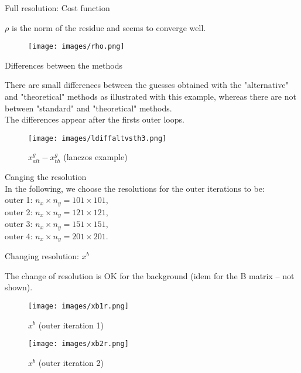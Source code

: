 \documentclass[francais]{beamer}
\begin{document}
\begin{frame}{Full resolution: Cost function}
\begin{center}
$\rho$ is the norm of the residue and seems to converge well.
\endminipage \hfill
{}%
\begin{figure}
  \texttt{[image: images/rho.png]}
\end{figure}
\endminipage
\end{center}
\end{frame}


\begin{frame}{Differences between the methods}
\begin{center}
There are small differences between the guesses obtained with the "alternative" and "theoretical" methods as illustrated with this example, whereas there are not between "standard" and "theoretical" methods.\\
The differences appear after the firsts outer loops.
\endminipage \hfill
{}%
\begin{figure}
  \texttt{[image: images/ldiffaltvsth3.png]}
  \caption{$x^g_{alt}-x^g_{th}$ (lanczos example)}
\end{figure}
\endminipage
\end{center}
\end{frame}


\begin{frame}
\begin{center}
  {\huge Canging the resolution}\\
  \vspace{+1cm}
In the following, we choose the resolutions for the outer iterations to be:\\
outer 1: $n_x \times n_y = 101 \times 101$,\\
outer 2: $n_x \times n_y = 121 \times 121$,\\
outer 3: $n_x \times n_y = 151 \times 151$,\\
outer 4: $n_x \times n_y = 201 \times 201$.
\end{center}
\end{frame}

\begin{frame}{Changing resolution: $x^b$}
\begin{center}
The change of resolution is OK for the background (idem for the B matrix -- not shown).
\begin{figure}
  \texttt{[image: images/xb1r.png]}
  \caption{$x^b$ (outer iteration 1)}
\endminipage\hfill
{}
  \texttt{[image: images/xb2r.png]}
  \caption{$x^b$ (outer iteration 2)}
\endminipage
\end{figure}
\end{center}
\end{frame}
\end{document}
